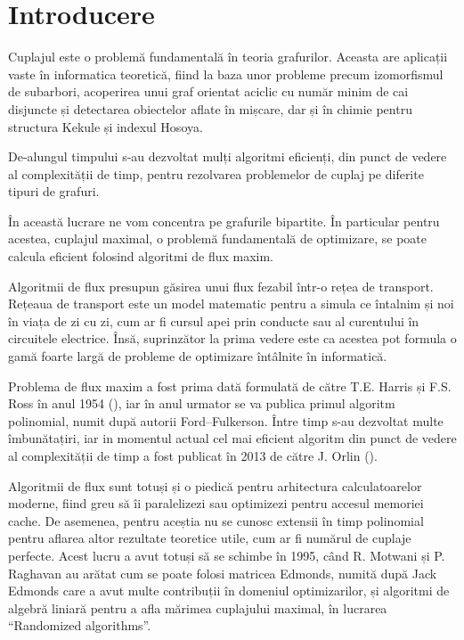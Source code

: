 \chapter{Introducere}

Cuplajul este o problemă fundamentală în teoria grafurilor. Aceasta are
aplicații vaste în informatica teoretică, fiind la baza unor probleme precum
izomorfismul de subarbori, acoperirea unui graf orientat aciclic cu număr minim
de cai disjuncte și detectarea obiectelor aflate în mișcare, dar și în chimie
pentru structura Kekule și indexul Hosoya. \par

De-alungul timpului s-au dezvoltat mulți algoritmi eficienți, din punct de
vedere al complexității de timp, pentru rezolvarea problemelor de cuplaj pe
diferite tipuri de grafuri. \par

În această lucrare ne vom concentra pe grafurile bipartite. În particular pentru
acestea, cuplajul maximal, o problemă fundamentală de optimizare, se poate
calcula eficient folosind algoritmi de flux maxim. \par

Algoritmii de flux presupun găsirea unui flux fezabil într-o rețea de transport.
Rețeaua de transport este un model matematic pentru a simula ce întalnim și noi
în viața de zi cu zi, cum ar fi cursul apei prin conducte sau al curentului în
circuitele electrice. Însă, suprinzător la prima vedere este ca acestea pot
formula o gamă foarte largă de probleme de optimizare întâlnite în informatică. \par

Problema de flux maxim a fost prima dată formulată de către T.E. Harris și F.S.
Ross în anul 1954 (\cite{flowhistory}), iar în anul urmator se va publica primul
algoritm polinomial, numit după autorii Ford–Fulkerson. Între timp s-au dezvoltat
multe îmbunătațiri, iar in momentul actual cel mai eficient algoritm din punct
de vedere al complexității de timp a fost publicat în 2013 de către J. Orlin (\cite{orlin}).

Algoritmii de flux sunt totuși și o piedică pentru arhitectura calculatoarelor
moderne, fiind greu să îi paralelizezi sau optimizezi pentru accesul memoriei cache.
De asemenea, pentru aceștia nu se cunosc extensii în timp polinomial pentru
aflarea altor rezultate teoretice utile, cum ar fi numărul de cuplaje perfecte.
Acest lucru a avut totuși să se schimbe în 1995, când R. Motwani și P. Raghavan
au arătat cum se poate folosi matricea Edmonds, numită după Jack Edmonds care a avut
multe contribuții în domeniul optimizarilor, și algoritmi de algebră liniară pentru
a afla mărimea cuplajului maximal, în lucrarea ``Randomized algorithms''\cite{randomizedalgorithms}. \par

